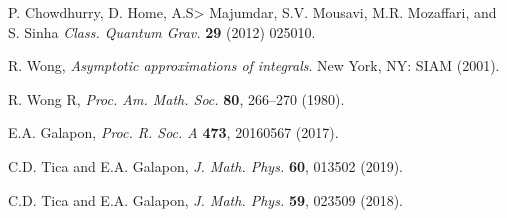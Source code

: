 \documentclass[%
 reprint,
 amsmath,amssymb,
 aps,
]{revtex4-1}
\begin{document}
\begin{thebibliography}{99}
 P. Chowdhurry, D. Home, A.S> Majumdar, S.V. Mousavi, M.R. Mozaffari, and S. Sinha {\it Class. Quantum Grav.} {\bf 29} (2012) 025010.

 R. Wong, {\it Asymptotic approximations of integrals}. New York, NY: SIAM (2001).

 R. Wong R, {\it Proc. Am. Math. Soc.} {\bf 80}, 266–270 (1980).

 E.A. Galapon, {\it Proc. R. Soc. A} {\bf 473},  20160567 (2017).

 C.D. Tica and E.A. Galapon, {\it J. Math. Phys.} {\bf 60}, 013502 (2019).

 C.D. Tica and E.A. Galapon, {\it J. Math. Phys.} {\bf 59}, 023509 (2018).
 
\end{thebibliography}
\end{document}
